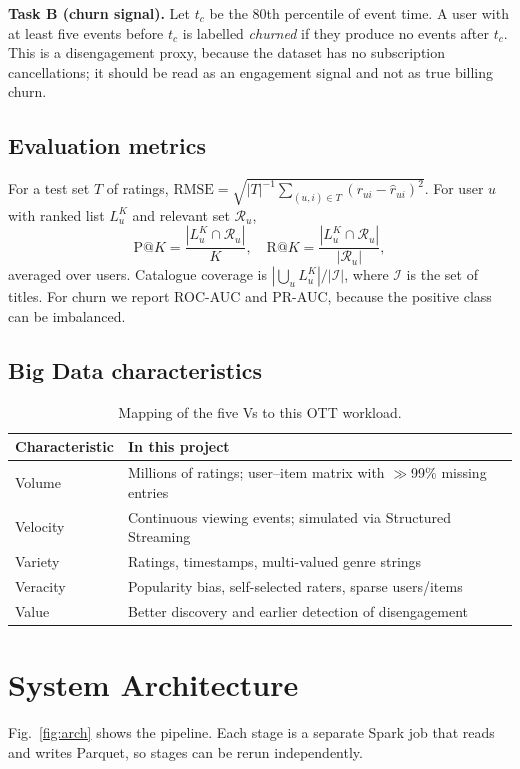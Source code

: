 \documentclass[conference]{IEEEtran}
\begin{document}
\textbf{Task B (churn signal).} Let $t_c$ be the 80th percentile of event time. A user with at least five events before $t_c$ is labelled \emph{churned} if they produce no events after $t_c$. This is a disengagement proxy, because the dataset has no subscription cancellations; it should be read as an engagement signal and not as true billing churn.

\subsection{Evaluation metrics}
For a test set $T$ of ratings, $\mathrm{RMSE}=\sqrt{|T|^{-1}\sum_{(u,i)\in T}(r_{ui}-\hat r_{ui})^2}$. For user $u$ with ranked list $L_u^{K}$ and relevant set $\mathcal{R}_u$,
\begin{equation}
\mathrm{P@}K=\frac{|L_u^{K}\cap\mathcal{R}_u|}{K},\quad \mathrm{R@}K=\frac{|L_u^{K}\cap\mathcal{R}_u|}{|\mathcal{R}_u|},
\end{equation}
averaged over users. Catalogue coverage is $|\bigcup_u L_u^{K}|/|\mathcal{I}|$, where $\mathcal{I}$ is the set of titles. For churn we report ROC-AUC and PR-AUC, because the positive class can be imbalanced.

\subsection{Big Data characteristics}
\begin{table}[t]
\caption{Mapping of the five Vs to this OTT workload.}
\label{tab:vs}
\centering
\small
\begin{tabular}{lp{5.2cm}}
\toprule
Characteristic & In this project \\
\midrule
Volume & Millions of ratings; user--item matrix with $\gg$99\% missing entries \\
Velocity & Continuous viewing events; simulated via Structured Streaming \\
Variety & Ratings, timestamps, multi-valued genre strings \\
Veracity & Popularity bias, self-selected raters, sparse users/items \\
Value & Better discovery and earlier detection of disengagement \\
\bottomrule
\end{tabular}
\end{table}

\section{System Architecture}
Fig.~\ref{fig:arch} shows the pipeline. Each stage is a separate Spark job that reads and writes Parquet, so stages can be rerun independently.
\end{document}
